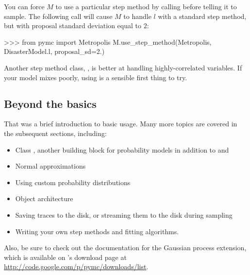 \documentclass[]{jss}
\begin{document}
You can force $M$ to use a particular step method by calling  before telling it to sample. The following call will cause $M$ to handle $l$ with a standard  step method, but with proposal standard deviation equal to $2$:
\begin{CodeInput}
>>> from pymc import Metropolis
M.use_step_method(Metropolis, DisasterModel.l, proposal_sd=2.)
\end{CodeInput}

Another step method class, , is better at handling highly-correlated variables. If your model mixes poorly, using  is a sensible first thing to try.



\subsection{Beyond the basics}
That was a brief introduction to basic  usage. Many more topics are covered in the subsequent sections, including:
\begin{itemize}
   \item Class , another building block for probability models in addition to  and 
   \item Normal approximations
   \item Using custom probability distributions
   \item Object architecture
   \item Saving traces to the disk, or streaming them to the disk during sampling
   \item Writing your own step methods and fitting algorithms.
\end{itemize}
Also, be sure to check out the documentation for the Gaussian process extension,
which is available on 's
download page at \href{http://code.google.com/p/pymc/downloads/list}{http://code.google.com/p/pymc/downloads/list}.
\end{document}
